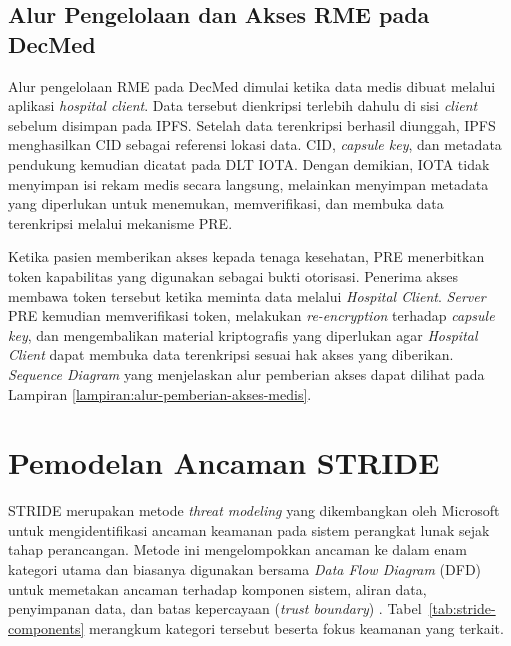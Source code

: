 \documentclass[bahasa, 12pt, a4paper, onecolumn, oneside, final]{report}
\begin{document}
\subsection{Alur Pengelolaan dan Akses RME pada DecMed}

Alur pengelolaan RME pada DecMed dimulai ketika data medis dibuat melalui aplikasi \textit{hospital client}. Data tersebut dienkripsi terlebih dahulu di sisi \textit{client} sebelum disimpan pada IPFS. Setelah data terenkripsi berhasil diunggah, IPFS menghasilkan CID sebagai referensi lokasi data. CID, \textit{capsule key}, dan metadata pendukung kemudian dicatat pada DLT IOTA. Dengan demikian, IOTA tidak menyimpan isi rekam medis secara langsung, melainkan menyimpan metadata yang diperlukan untuk menemukan, memverifikasi, dan membuka data terenkripsi melalui mekanisme PRE.

Ketika pasien memberikan akses kepada tenaga kesehatan, PRE menerbitkan token kapabilitas yang digunakan sebagai bukti otorisasi. Penerima akses membawa token tersebut ketika meminta data melalui \textit{Hospital Client}. \textit{Server} PRE kemudian memverifikasi token, melakukan \textit{re-encryption} terhadap \textit{capsule key}, dan mengembalikan material kriptografis yang diperlukan agar \textit{Hospital Client} dapat membuka data terenkripsi sesuai hak akses yang diberikan. \textit{Sequence Diagram} yang menjelaskan alur pemberian akses dapat dilihat pada Lampiran \ref{lampiran:alur-pemberian-akses-medis}.
\section{Pemodelan Ancaman STRIDE}
\label{sec:stride}

STRIDE merupakan metode \textit{threat modeling} yang dikembangkan oleh Microsoft untuk mengidentifikasi ancaman keamanan pada sistem perangkat lunak sejak tahap perancangan. Metode ini mengelompokkan ancaman ke dalam enam kategori utama dan biasanya digunakan bersama \textit{Data Flow Diagram} (DFD) untuk memetakan ancaman terhadap komponen sistem, aliran data, penyimpanan data, dan batas kepercayaan (\textit{trust boundary}) \autocite{shostack2014threatmodeling,microsoft2006msdnstride}. Tabel~\ref{tab:stride-components} merangkum kategori tersebut beserta fokus keamanan yang terkait.
\end{document}
